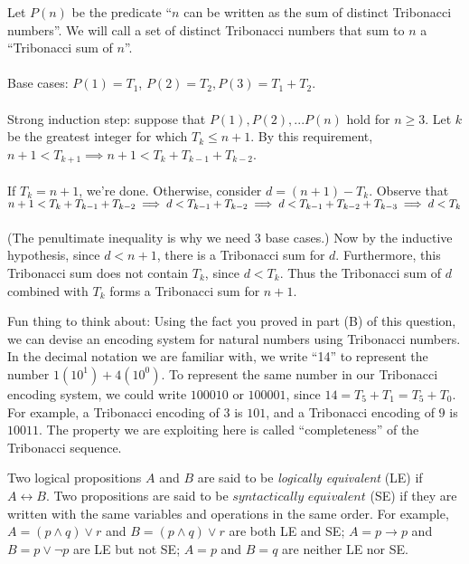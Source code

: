 \documentclass[solution, letterpaper]{cs20}
\begin{document}
\begin{solution}
\subsolution
Let $P(n)$ be the predicate ``$n$ can be written as the sum of distinct Tribonacci numbers''. We will call a set of distinct Tribonacci numbers that sum to $n$ a ``Tribonacci sum of $n$''. 
\\\\
Base cases: $P(1) = T_1$, $P(2) = T_2, P(3) = T_1 + T_2$. 
\\\\
Strong induction step: suppose that $P(1), P(2), ... P(n)$ hold for $n \ge 3$. Let $k$ be the greatest integer for which $T_k \le n+1$. By this requirement, $n+1 < T_{k+1} \implies n+1 < T_k + T_{k-1} + T_{k-2}$. 
\\\\If $T_k = n+1$, we're done. Otherwise, consider $d = (n+1)-T_k$. Observe that 
\begin{math}
n+1 < T_k + T_{k-1} + T_{k-2} 
\\ \implies d < T_{k-1} + T_{k-2}
\\ \implies d < T_{k-1} + T_{k-2} + T_{k-3} 
\\ \implies d < T_k
\end{math}
\\\\(The penultimate inequality is why we need 3 base cases.)  Now by the inductive hypothesis, since $d < n+1$, there is a Tribonacci sum for $d$. Furthermore, this Tribonacci sum does not contain $T_k$, since $d < T_k$. Thus the Tribonacci sum of $d$ combined with $T_k$ forms a Tribonacci sum for $n+1$.
\begin{tiny}
Fun thing to think about: Using the fact you proved in part (B) of this question, we can devise an encoding system for natural numbers using Tribonacci numbers. In the decimal notation we are familiar with, we write ``14'' to represent the number $1(10^1) + 4(10^0)$. To represent the same number in our Tribonacci encoding system, we could write $100010$ or $100001$, since $14 = T_5 + T_1 = T_5 + T_0$. For example, a Tribonacci encoding of $3$ is $101$, and a Tribonacci encoding of $9$ is $10011$. The property we are exploiting here is called ``completeness'' of the Tribonacci sequence.
\end{tiny}
\end{solution}


Two logical propositions $A$ and $B$ are said to be \textit{logically equivalent} (LE) if $A \leftrightarrow B$. Two propositions are said to be $\textit{syntactically equivalent}$ (SE) if they are written with the same variables and operations in the same order. For example, $A = (p \land q) \lor r$ and $B = (p \land q) \lor r$ are both LE and SE; $A  = p \to p$ and $B = p \lor \neg p$ are LE but not SE; $A = p$ and $B = q$ are neither LE nor SE.
\end{document}
